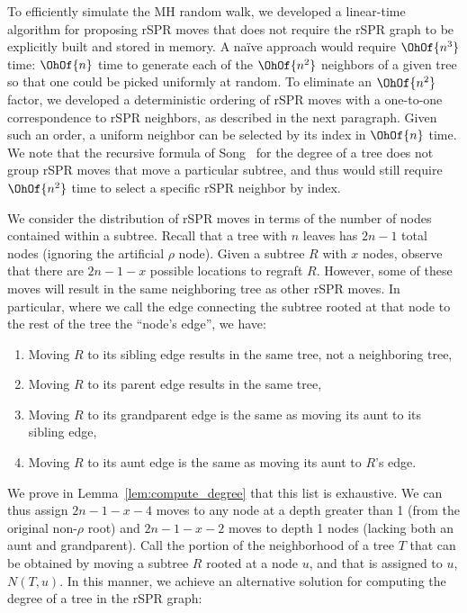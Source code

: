 \documentclass[11pt,onecolumn,conference]{IEEEtran}
\begin{document}
To efficiently simulate the MH random walk, we developed a linear-time algorithm for proposing rSPR moves that does not require the rSPR graph to be explicitly built and stored in memory.
A na\"ive approach would require $\OhOf{n^3}$ time: $\OhOf{n}$ time to generate each of the $\OhOf{n^2}$ neighbors of a given tree so that one could be picked uniformly at random.
To eliminate an $\OhOf{n^2}$ factor, we developed a deterministic ordering of rSPR moves with a one-to-one correspondence to rSPR neighbors, as described in the next paragraph.
Given such an order, a uniform neighbor can be selected by its index in $\OhOf{n}$ time.
We note that the recursive formula of Song~\cite{Song2003-gf} for the degree of a tree does not group rSPR moves that move a particular subtree, and thus would still require $\OhOf{n^2}$ time to select a specific rSPR neighbor by index.

We consider the distribution of rSPR moves in terms of the number of nodes contained within a subtree.
Recall that a tree with $n$ leaves has $2n-1$ total nodes (ignoring the artificial $\rho$ node).
Given a subtree $R$ with $x$ nodes, observe that there are $2n-1 - x$ possible locations to regraft $R$.
However, some of these moves will result in the same neighboring tree as other rSPR moves.
In particular, where we call the edge connecting the subtree rooted at that node to the rest of the tree the ``node's edge'', we have:
\begin{enumerate}
\item Moving $R$ to its sibling edge results in the same tree, not a neighboring tree,
\item Moving $R$ to its parent edge results in the same tree,
\item Moving $R$ to its grandparent edge is the same as moving its aunt to its sibling edge,
\item Moving $R$ to its aunt edge is the same as moving its aunt to $R$'s edge.
\end{enumerate}
We prove in Lemma~\ref{lem:compute_degree} that this list is exhaustive.
We can thus assign $2n-1-x-4$ moves to any node at a depth greater than 1 (from the original non-$\rho$ root) and $2n-1-x-2$ moves to depth 1 nodes (lacking both an aunt and grandparent).
Call the portion of the neighborhood of a tree $T$ that can be obtained by moving a subtree $R$ rooted at a node $u$, and that is assigned to $u$, $N(T,u)$.
In this manner, we achieve an alternative solution for computing the degree of a tree in the rSPR graph:
\end{document}
